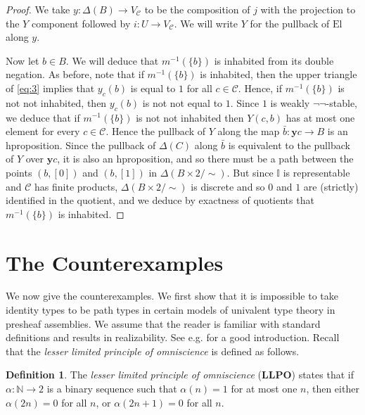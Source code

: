 \documentclass[a4paper]{amsart}
\theoremstyle{definition}
\newtheorem{definition}[theorem]{Definition}
\newcommand{\smcat}[1]{\mathcal{#1}}
\newcommand{\intv}{\mathbb{I}}
\newcommand{\nat}{\mathbb{N}}
\newcommand{\elv}{\mathrm{El}}
\newcommand{\yoneda}{\mathbf{y}}
\newcommand{\llpo}{\mathbf{LLPO}}
\begin{document}
\begin{proof}
  We take $y \colon \Delta(B) \to V_\smcat{C}$ to be the composition
  of $j$ with the projection to the $Y$ component followed by $i
  \colon U \to V_\smcat{C}$. We will write $Y$ for the pullback of
  $\elv$ along $y$.

  Now let $b \in B$. We will deduce that $m^{-1}(\{b\})$ is inhabited
  from its double negation. As before, note that if $m^{-1}(\{b\})$ is
  inhabited, then the upper triangle of \eqref{eq:3} implies that
  $y_c(b)$ is equal to $1$ for all $c \in \smcat{C}$.
  Hence, if $m^{-1}(\{b\})$ is not not
  inhabited, then $y_c(b)$ is not not equal to $1$. Since $1$ is weakly
  $\neg \neg$-stable, we deduce that if $m^{-1}(\{b\})$ is not not
  inhabited then $Y(c, b)$ has at most one element for every $c \in
  \smcat{C}$. Hence the
  pullback of $Y$ along the map $\bar{b} \colon \yoneda c \to B$ is an
  hproposition. Since the pullback of $\Delta(C)$ along $\bar{b}$ is
  equivalent to the pullback of $Y$ over $\yoneda c$,
  it is also an hproposition, and so
  there must be a path between the points $(b, [0])$ and $(b, [1])$ in
  $\Delta(B \times 2/{\sim})$. But since $\intv$ is
  representable and $\smcat{C}$ has finite products,
  $\Delta(B \times 2/{\sim})$ is discrete and so $0$ and $1$ are
  (strictly) identified in the quotient, and we deduce by exactness of
  quotients that $m^{-1}(\{b\})$ is inhabited.
\end{proof}


\section{The Counterexamples}

We now give the counterexamples. We first show that it is impossible
to take identity types to be path types in certain models of univalent
type theory in presheaf assemblies. We assume that the reader is
familiar with standard definitions and results in realizability. See
e.g. \cite{vanoosten} for a good introduction. Recall that the
\emph{lesser limited principle of omniscience} is defined as follows.

\begin{definition}
  The \emph{lesser limited principle of omniscience} ($\llpo$) states
  that if $\alpha \colon \nat \to 2$ is a binary sequence such that
  $\alpha(n) = 1$ for at most one $n$, then either $\alpha(2n) = 0$
  for all $n$, or $\alpha(2n + 1) = 0$ for all $n$.
\end{definition}
\end{document}
